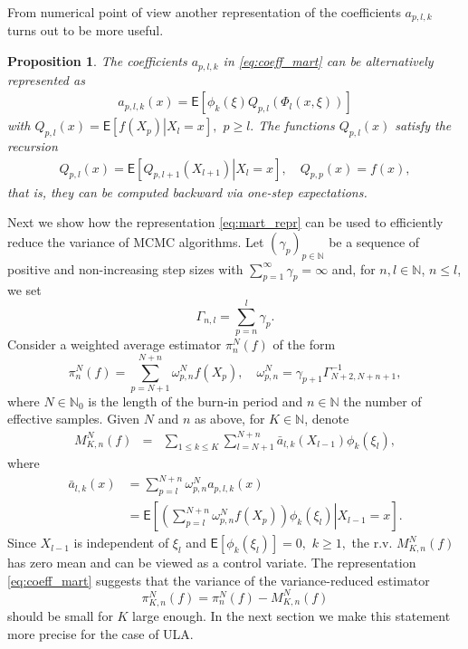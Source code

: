 \documentclass[article]{elsarticle}
\newtheorem{prop}[thm]{Proposition}
\begin{document}
From  numerical point of view another representation of the coefficients \(a_{p,l,k}\)  turns out to be more useful.
\begin{prop}
The coefficients \(a_{p,l,k}\) in \eqref{eq:coeff_mart}  can be alternatively represented as
\begin{eqnarray*}
a_{p,l,k}(x)=\mathsf{E}\left[\phi_k\left(\xi\right)Q_{p,l}\left(\Phi_l(x,\xi)\right)\right]
\end{eqnarray*}
with \(Q_{p,l}(x)=\mathsf{E}\left[\left.f(X_{p})\right|X_{l}=x\right],\) \(p\geq l.\)
The functions \(Q_{p,l}(x)\)   satisfy the recursion
\begin{eqnarray}
\label{eq:qpl}
Q_{p,l}(x)=\mathsf{E}\left[\left.Q_{p,l+1}(X_{l+1})\right|X_{l}=x\right],\quad Q_{p,p}(x)=f(x),
\end{eqnarray}
that is, they can be computed backward via  one-step expectations.
\end{prop}
Next we show how  the representation \eqref{eq:mart_repr} can be used to efficiently reduce the variance of MCMC algorithms.  Let $(\gamma_{p})_{p\in\mathbb N}$ be a sequence of positive and non-increasing
step sizes
with $\sum_{p=1}^\infty \gamma_p=\infty$
and, for $n,l\in\mathbb{N}$, $n\le l$, we set
\[
\Gamma_{n,l}=\sum_{p=n}^{l}\gamma_{p}.
\]
 Consider a weighted average estimator $\pi_{n}^{N}(f)$ of the form
\begin{equation}\label{eq:29032018a2}
\pi_{n}^{N}(f)=\sum_{p=N+1}^{N+n}\omega_{p,n}^{N}f(X_{p}),\quad\omega_{p,n}^{N}=\gamma_{p+1}\Gamma_{N+2,N+n+1}^{-1},
\end{equation}
where $N\in\mathbb N_0$ is the length of the burn-in period and $n\in\mathbb N$
the number of effective samples.
Given $N$ and $n$ as above, for $K\in\mathbb N$, denote
\begin{eqnarray}
M_{K,n}^N(f) & =&\sum_{1\leq k\le K}\sum_{l=N+1}^{N+n}\bar a_{l,k}(X_{l-1})\phi_k(\xi_{l}),
\label{eq:29032018a5}
\end{eqnarray}
where
\begin{align*}
\bar{a}_{l,k}(x)
& =\sum_{p=l}^{N+n}\omega_{p,n}^{N}a_{p,l,k}(x)\\
& =\mathsf{E}\left[\left.\left(\sum_{p=l}^{N+n}\omega_{p,n}^{N}f(X_{p})\right)\phi_k(\xi_{l})\right|X_{l-1}=x\right].
\end{align*}
Since \(X_{l-1}\) is independent of \(\xi_{l}\) and \(\mathsf{E}[\phi_k(\xi_{l})]=0,\) \(k\geq 1,\)  the r.v.  \(M_{K,n}^N(f)\) has zero mean and can be viewed as a control variate. The representation \eqref{eq:coeff_mart} suggests that the variance of  the  variance-reduced estimator  \begin{equation}\label{eq:29032018a3}
\pi_{K,n}^N(f)=\pi_n^N(f)-M_{K,n}^N(f)
\end{equation}
should be small for \(K\) large enough. In the next section  we make this statement more precise for the case of ULA.
\end{document}
